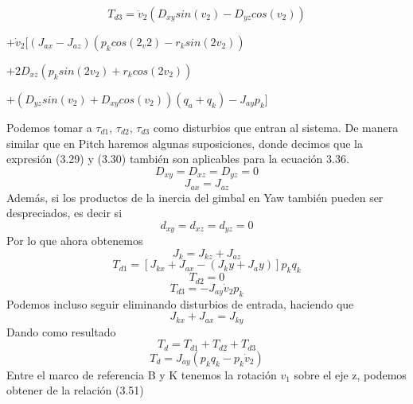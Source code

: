 \begin{equation}
	T_{d3} = \ddot{v}_2(D_{xy}sin(v_2)-D_{yz}cos(v_2))
\end{equation}
\begin{center}
	$+ \dot{v}_2[(J_{ax}-J_{az})(p_kcos(2_v2)-r_ksin(2v_2))$
\end{center}
\begin{center}
	$+2D_{xz}(p_ksin(2v_2)+r_kcos(2v_2))$
\end{center}
\begin{center}
	$
	+(D_{yz}sin(v_2) + D_{xy}cos(v_2))(q_a+q_k) - J_{ay}p_k]
	$
\end{center}
Podemos tomar a $\tau_{d1}$, $\tau_{d2}$, $\tau_{d3}$ como disturbios que entran al sistema. De manera similar que en Pitch haremos algunas suposiciones, donde decimos que
la expresión (3.29) y (3.30) también son aplicables para la ecuación 3.36.
\begin{equation}
	D_{xy} = D_{xz} = D_{yz} = 0
\end{equation}
\begin{equation}
	J_{ax} = J_{az}
\end{equation}
Además, si los productos de la inercia del gimbal en Yaw también pueden ser despreciados, es decir si
\begin{equation}
	d_{xy} = d_{xz} = d_{yz} = 0
\end{equation}
Por lo que ahora obtenemos 
\begin{equation}
	J_k = J_{kz} + J_{az}
\end{equation}
\begin{equation}
	T_{d1} = [J_{kx} + J_{ax} - (J_ky + J_ay)]p_kq_k
\end{equation}
\begin{equation}
	T_{d2} = 0
\end{equation}
\begin{equation}
	T_{d3} = -J_{ay} \dot{v}_2p_k
\end{equation}
Podemos incluso seguir eliminando disturbios de entrada, haciendo que
\begin{equation}
	J_{kx} + J_{ax} = J_{ky}
\end{equation}
Dando como resultado
\begin{equation}
	T_d = T_{d1} + T_{d2} + T_{d3}
\end{equation}
\begin{equation}
	T_d = J_{ay}(p_kq_k - p_k\dot{v}_2)
\end{equation}
Entre el marco de referencia B y K tenemos la rotación $v_1$ sobre el eje z, podemos obtener de \cite{Book:Barfoot2020} la relación (3.51)
